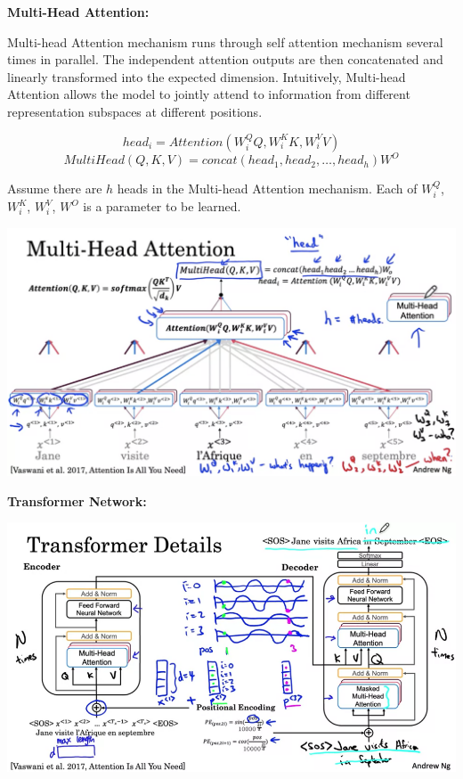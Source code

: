 \documentclass{article}
\begin{document}
\noindent \textbf{Multi-Head Attention:}

\noindent Multi-head Attention mechanism runs through self attention mechanism several times in parallel. The independent attention outputs are then concatenated and linearly transformed into the expected dimension. Intuitively, Multi-head Attention allows the model to jointly attend to information from different representation subspaces at different positions.

\[head_{i} = Attention(W_{i}^{Q} Q, W_{i}^{K} K, W_{i}^{V} V)\]
\[MultiHead(Q, K, V) = concat(head_{1}, head_{2}, \dots, head_{h}) W^{O}\]

\noindent Assume there are \(h\) heads in the Multi-head Attention mechanism. Each of \(W_{i}^{Q}\), \(W_{i}^{K}\), \(W_{i}^{V}\), \(W^{O}\) is a parameter to be learned.

\begin{center}
\includegraphics[scale=0.3]{./images/multi_head_attention.png}
\end{center}

\noindent \textbf{Transformer Network:}

\begin{center}
\includegraphics[scale=0.3]{./images/transformer_network.png}
\end{center}
\end{document}
